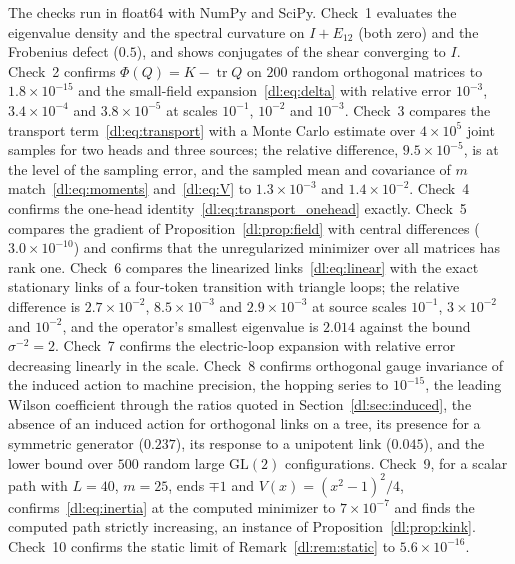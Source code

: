 \documentclass[11pt]{article}
\theoremstyle{definition}
\theoremstyle{remark}
\providecommand{\GL}{\mathrm{GL}}
\providecommand{\tr}{\operatorname{tr}}
\begin{document}
The checks run in float64 with NumPy and SciPy. Check~1 evaluates the eigenvalue density and the spectral curvature on $I+E_{12}$ (both zero) and the Frobenius defect ($0.5$), and shows conjugates of the shear converging to $I$. Check~2 confirms $\Phi(Q)=K-\tr Q$ on $200$ random orthogonal matrices to $1.8\times10^{-15}$ and the small-field expansion~\eqref{dl:eq:delta} with relative error $10^{-3}$, $3.4\times10^{-4}$ and $3.8\times10^{-5}$ at scales $10^{-1}$, $10^{-2}$ and $10^{-3}$. Check~3 compares the transport term~\eqref{dl:eq:transport} with a Monte Carlo estimate over $4\times10^5$ joint samples for two heads and three sources; the relative difference, $9.5\times10^{-5}$, is at the level of the sampling error, and the sampled mean and covariance of $m$ match~\eqref{dl:eq:moments} and~\eqref{dl:eq:V} to $1.3\times10^{-3}$ and $1.4\times10^{-2}$. Check~4 confirms the one-head identity~\eqref{dl:eq:transport_onehead} exactly. Check~5 compares the gradient of Proposition~\ref{dl:prop:field} with central differences ($3.0\times10^{-10}$) and confirms that the unregularized minimizer over all matrices has rank one. Check~6 compares the linearized links~\eqref{dl:eq:linear} with the exact stationary links of a four-token transition with triangle loops; the relative difference is $2.7\times10^{-2}$, $8.5\times10^{-3}$ and $2.9\times10^{-3}$ at source scales $10^{-1}$, $3\times10^{-2}$ and $10^{-2}$, and the operator's smallest eigenvalue is $2.014$ against the bound $\sigma^{-2}=2$. Check~7 confirms the electric-loop expansion with relative error decreasing linearly in the scale. Check~8 confirms orthogonal gauge invariance of the induced action to machine precision, the hopping series to $10^{-15}$, the leading Wilson coefficient through the ratios quoted in Section~\ref{dl:sec:induced}, the absence of an induced action for orthogonal links on a tree, its presence for a symmetric generator ($0.237$), its response to a unipotent link ($0.045$), and the lower bound over $500$ random large $\GL(2)$ configurations. Check~9, for a scalar path with $L=40$, $m=25$, ends $\mp1$ and $V(x)=(x^2-1)^2/4$, confirms~\eqref{dl:eq:inertia} at the computed minimizer to $7\times10^{-7}$ and finds the computed path strictly increasing, an instance of Proposition~\ref{dl:prop:kink}. Check~10 confirms the static limit of Remark~\ref{dl:rem:static} to $5.6\times10^{-16}$.
\end{document}
